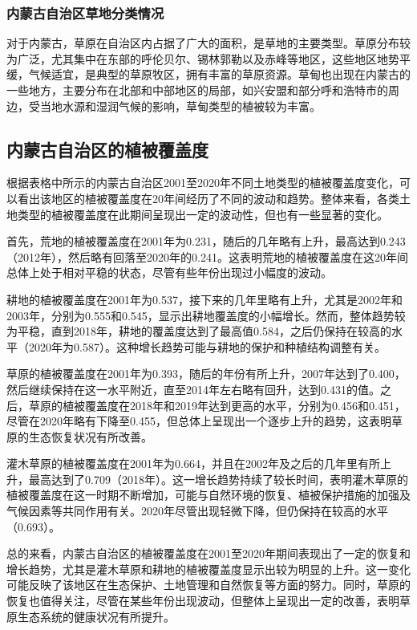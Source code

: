 \documentclass[AutoFakeBold]{LZUThesis-PgD&PhD}
\begin{document}
	\subsubsection{内蒙古自治区草地分类情况}
		\par 对于内蒙古，草原在自治区内占据了广大的面积，是草地的主要类型。草原分布较为广泛，尤其集中在东部的呼伦贝尔、锡林郭勒以及赤峰等地区，这些地区地势平缓，气候适宜，是典型的草原牧区，拥有丰富的草原资源。草甸也出现在内蒙古的一些地方，主要分布在北部和中部地区的局部，如兴安盟和部分呼和浩特市的周边，受当地水源和湿润气候的影响，草甸类型的植被较为丰富。

		\subsection{内蒙古自治区的植被覆盖度}
		
		\par	根据表格中所示的内蒙古自治区2001至2020年不同土地类型的植被覆盖度变化，可以看出该地区的植被覆盖度在20年间经历了不同的波动和趋势。整体来看，各类土地类型的植被覆盖度在此期间呈现出一定的波动性，但也有一些显著的变化。
		
		首先，荒地的植被覆盖度在2001年为0.231，随后的几年略有上升，最高达到0.243（2012年），然后略有回落至2020年的0.241。这表明荒地的植被覆盖度在这20年间总体上处于相对平稳的状态，尽管有些年份出现过小幅度的波动。
		
		耕地的植被覆盖度在2001年为0.537，接下来的几年里略有上升，尤其是2002年和2003年，分别为0.555和0.545，显示出耕地覆盖度的小幅增长。然而，整体趋势较为平稳，直到2018年，耕地的覆盖度达到了最高值0.584，之后仍保持在较高的水平（2020年为0.587）。这种增长趋势可能与耕地的保护和种植结构调整有关。
		
		草原的植被覆盖度在2001年为0.393，随后的年份有所上升，2007年达到了0.400，然后继续保持在这一水平附近，直至2014年左右略有回升，达到0.431的值。之后，草原的植被覆盖度在2018年和2019年达到更高的水平，分别为0.456和0.451，尽管在2020年略有下降至0.455，但总体上呈现出一个逐步上升的趋势，这表明草原的生态恢复状况有所改善。
		
		灌木草原的植被覆盖度在2001年为0.664，并且在2002年及之后的几年里有所上升，最高达到了0.709（2018年）。这一增长趋势持续了较长时间，表明灌木草原的植被覆盖度在这一时期不断增加，可能与自然环境的恢复、植被保护措施的加强及气候因素等共同作用有关。2020年尽管出现轻微下降，但仍保持在较高的水平（0.693）。
		
		总的来看，内蒙古自治区的植被覆盖度在2001至2020年期间表现出了一定的恢复和增长趋势，尤其是灌木草原和耕地的植被覆盖度显示出较为明显的上升。这一变化可能反映了该地区在生态保护、土地管理和自然恢复等方面的努力。同时，草原的恢复也值得关注，尽管在某些年份出现波动，但整体上呈现出一定的改善，表明草原生态系统的健康状况有所提升。
\end{document}
